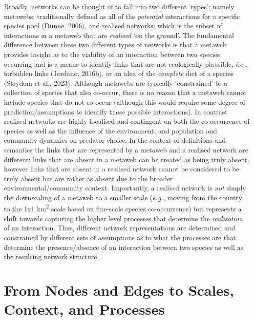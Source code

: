 \documentclass[
]{article}
\begin{document}
Broadly, networks can be thought of to fall into two different `types';
namely metawebs; traditionally defined as all of the \emph{potential}
interactions for a specific species pool (Dunne, 2006), and realised
networks; which is the subset of interactions in a metaweb that are
\emph{realised} `on the ground'. The fundamental difference between
these two different types of networks is that a metaweb provides insight
as to the viability of an interaction between two species occurring and
is a means to identify links that are not ecologically plausible,
\emph{i.e.,} forbidden links (Jordano, 2016b), or an idea of the
\emph{complete} diet of a species (Strydom et al., 2023). Although
metawebs are typically `constrained' to a collection of species that
also co-occur, there is no reason that a metaweb cannot include species
that do not co-occur (although this would require some degree of
prediction/assumptions to identify those possible interactions). In
contrast realised networks are highly localised and contingent on both
the co-occurrence of species as well as the influence of the
environment, and population and community dynamics on predator choice.
In the context of definitions and semantics the links that are
represented by a metaweb and a realised network are different; links
that are absent in a metaweb can be treated as being truly absent,
however links that are absent in a realised network cannot be considered
to be truly absent but are rather as absent due to the broader
environmental/community context. Importantly, a realised network is
\emph{not} simply the downscaling of a metaweb to a smaller scale
(\emph{e.g.,} moving from the country to the 1x1 km\textsuperscript{2}
scale based on fine-scale species co-occurrence) but represents a shift
towards capturing the higher level processes that determine the
\emph{realisation} of an interaction. Thus, different network
representations are determined and constrained by different sets of
assumptions as to what the processes are that determine the
presence/absence of an interaction between two species as well as the
resulting network structure.

\section{From Nodes and Edges to Scales, Context, and
Processes}\label{sec-process}
\end{document}
